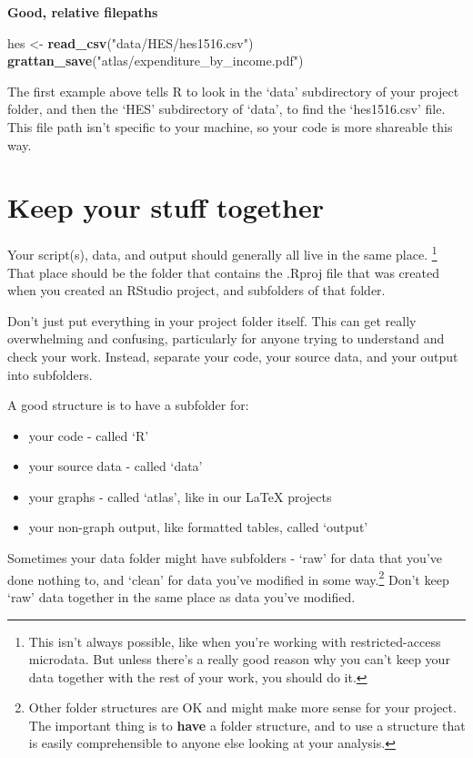 \documentclass[]{book}
\newenvironment{Shaded}{\begin{snugshade}}{\end{snugshade}}
\newcommand{\KeywordTok}[1]{\textcolor[rgb]{0.13,0.29,0.53}{\textbf{#1}}}
\newcommand{\NormalTok}[1]{#1}
\newcommand{\StringTok}[1]{\textcolor[rgb]{0.31,0.60,0.02}{#1}}
\providecommand{\tightlist}{%
  \setlength{\itemsep}{0pt}\setlength{\parskip}{0pt}}
\let\rmarkdownfootnote\footnote%
\def\footnote{\protect\rmarkdownfootnote}
\begin{document}
\textbf{Good, relative filepaths}

\begin{Shaded}
\begin{Highlighting}[]
\NormalTok{hes <-}\StringTok{ }\KeywordTok{read_csv}\NormalTok{(}\StringTok{"data/HES/hes1516.csv"}\NormalTok{)}
\KeywordTok{grattan_save}\NormalTok{(}\StringTok{"atlas/expenditure_by_income.pdf"}\NormalTok{)}
\end{Highlighting}
\end{Shaded}

The first example above tells R to look in the `data' subdirectory of your project folder, and then the `HES' subdirectory of `data', to find the `hes1516.csv' file. This file path isn't specific to your machine, so your code is more shareable this way.

\hypertarget{keep-your-stuff-together}{%
\section{Keep your stuff together}\label{keep-your-stuff-together}}

Your script(s), data, and output should generally all live in the same place. \footnote{This isn't always possible, like when you're working with restricted-access microdata. But unless there's a really good reason why you can't keep your data together with the rest of your work, you should do it.} That place should be the folder that contains the .Rproj file that was created when you created an RStudio project, and subfolders of that folder.

Don't just put everything in your project folder itself. This can get really overwhelming and confusing, particularly for anyone trying to understand and check your work. Instead, separate your code, your source data, and your output into subfolders.

A good structure is to have a subfolder for:

\begin{itemize}
\tightlist
\item
  your code - called `R'
\item
  your source data - called `data'
\item
  your graphs - called `atlas', like in our LaTeX projects
\item
  your non-graph output, like formatted tables, called `output'
\end{itemize}

Sometimes your data folder might have subfolders - `raw' for data that you've done nothing to, and `clean' for data you've modified in some way.\footnote{Other folder structures are OK and might make more sense for your project. The important thing is to \textbf{have} a folder structure, and to use a structure that is easily comprehensible to anyone else looking at your analysis.} Don't keep `raw' data together in the same place as data you've modified.
\end{document}
